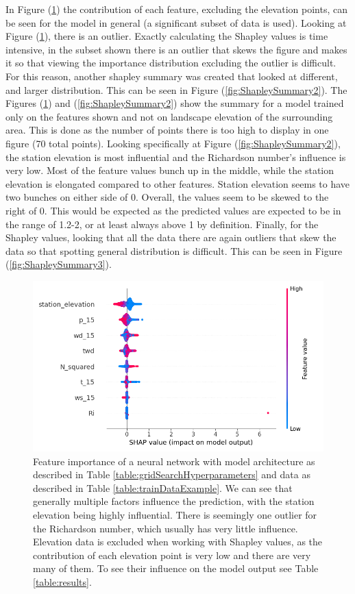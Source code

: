In Figure (\ref{fig:ShapleySummary}) the contribution of each feature, excluding the elevation points, can be seen for the model in general (a significant subset of data is used). Looking at Figure (\ref{fig:ShapleySummary}), there is an outlier. Exactly calculating the Shapley values is time intensive, in the subset shown there is an outlier that skews the figure and makes it so that viewing the importance distribution excluding the outlier is difficult. For this reason, another shapley summary was created that looked at different, and larger distribution. This can be seen in Figure (\ref{fig:ShapleySummary2}). The Figures (\ref{fig:ShapleySummary}) and (\ref{fig:ShapleySummary2}) show the summary for a model trained only on the features shown and not on landscape elevation of the surrounding area. This is done as the number of points there is too high to display in one figure (70 total points). Looking specifically at Figure (\ref{fig:ShapleySummary2}), the station elevation is most influential and the Richardson number's influence is very low. Most of the feature values bunch up in the middle, while the station elevation is elongated compared to other features. Station elevation seems to have two bunches on either side of 0. Overall, the values seem to be skewed to the right of 0. This would be expected as the predicted values are expected to be in the range of 1.2-2, or at least always above 1 by definition. Finally, for the Shapley values, looking that all the data there are again outliers that skew the data so that spotting general distribution is difficult. This can be seen in Figure (\ref{fig:ShapleySummary3}).

\begin{figure}
    \centering
    \includegraphics[scale = 0.6]{Figures/shap_plots/summary_plot.png}
    \caption[Summary feature importance of a neural network.]{Feature importance of a neural network with model architecture as described in Table \ref{table:gridSearchHyperparameters} and data as described in Table \ref{table:trainDataExample}. We can see that generally multiple factors influence the prediction, with the station elevation being highly influential. There is seemingly one outlier for the Richardson number, which usually has very little influence. Elevation data is excluded when working with Shapley values, as the contribution of each elevation point is very low and there are very many of them. To see their influence on the model output see Table \ref{table:results}.}
    \label{fig:ShapleySummary}
\end{figure}


